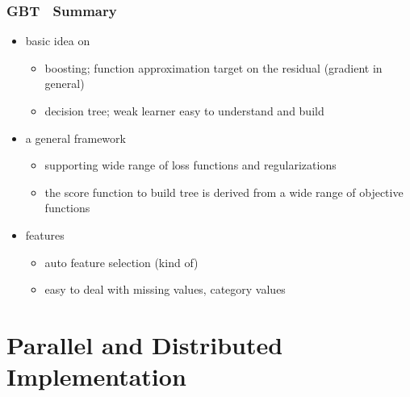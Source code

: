 \documentclass{beamer}
\begin{document}
\begin{frame}
	\frametitle{GBT　Summary}
	\begin{itemize}
		\item basic idea on
		\begin{itemize}
			\item boosting; function approximation target on the residual (gradient in general)
			\item decision tree; weak learner easy to understand and build
		\end{itemize}
		\item a general framework
		\begin{itemize}
			\item supporting wide range of loss functions and regularizations
			\item the score function to build tree is derived from a wide range of objective functions
		\end{itemize}
		\item features
		\begin{itemize}
			\item auto feature selection (kind of)
			\item easy to deal with missing values, category values
		\end{itemize}		

		
	\end{itemize}
	
\end{frame}

\section{Parallel and Distributed Implementation} %
\end{document}
